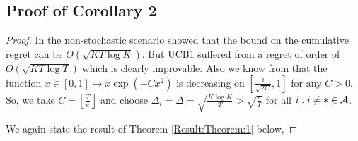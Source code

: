 \subsection{Proof of Corollary 2}
\label{sec:proofTheorem:Corollary2}
\begin{proof}
\label{Proof:Corollary:2}
In the non-stochastic scenario \cite{auer2002nonstochastic} showed that the bound on the cumulative regret can be $O\left(\sqrt{KT\log K}\right)$. But UCB1 suffered from a regret of order of  $O\left(\sqrt{KT\log T}\right)$  which is clearly improvable. Also we know from \citet{bubeck2011pure} that the function $x\in [0,1]\mapsto x\exp(-Cx^2)$ is  decreasing on $\left[\frac{1}{\sqrt{2C}},1\right ]$ for any $C>0$. So, we take $C=\left\lfloor \frac{T}{e}\right\rfloor$ and choose  $\Delta_{i}=\Delta=\sqrt{\frac{K\log K}{T}}>\sqrt{\frac{e}{T}}$ for all ${i:i\neq *}\in \mathcal{A} $.



%
	
	We again state the result of Theorem \ref{Result:Theorem:1} below, 
	

\end{proof}
